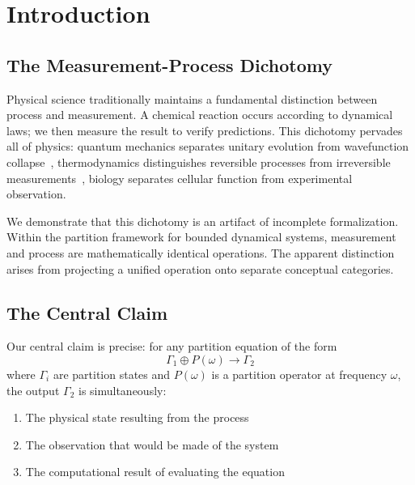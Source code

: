 \documentclass[aps,prd,twocolumn,superscriptaddress,floatfix,nofootinbib]{revtex4-2}
\theoremstyle{remark}
\newcommand{\Pop}{P}
\newcommand{\Gstate}{\Gamma}
\begin{document}
\maketitle

\section{Introduction}
\label{sec:introduction}

\subsection{The Measurement-Process Dichotomy}

Physical science traditionally maintains a fundamental distinction between process and measurement. A chemical reaction occurs according to dynamical laws; we then measure the result to verify predictions. This dichotomy pervades all of physics: quantum mechanics separates unitary evolution from wavefunction collapse~\cite{vonneumann1932,wheeler1983}, thermodynamics distinguishes reversible processes from irreversible measurements~\cite{landauer1961}, biology separates cellular function from experimental observation.

We demonstrate that this dichotomy is an artifact of incomplete formalization. Within the partition framework for bounded dynamical systems, measurement and process are mathematically identical operations. The apparent distinction arises from projecting a unified operation onto separate conceptual categories.

\subsection{The Central Claim}

Our central claim is precise: for any partition equation of the form
\begin{equation}
\Gstate_1 \oplus \Pop(\omega) \to \Gstate_2
\label{eq:central_form}
\end{equation}
where $\Gstate_i$ are partition states and $\Pop(\omega)$ is a partition operator at frequency $\omega$, the output $\Gstate_2$ is simultaneously:
\begin{enumerate}
\item The physical state resulting from the process
\item The observation that would be made of the system
\item The computational result of evaluating the equation
\end{enumerate}
\end{document}
